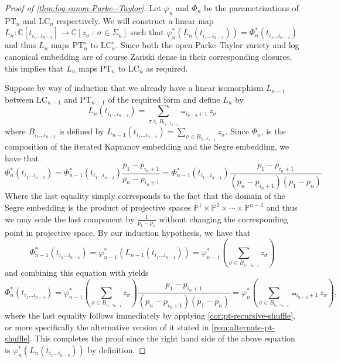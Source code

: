 \documentclass[12pt, reqno]{amsart}
\numberwithin{equation}{section}
\theoremstyle{plain}
\theoremstyle{definition}
\newcommand{\cc}{\mathbb{C}}
\newcommand{\pp}{\mathbb{P}}
\newcommand{\pt}{\mathrm{PT}}
\newcommand{\lc}{\mathrm{LC}}
\begin{document}
\begin{proof}[Proof of \cref{thm:log-canon-Parke--Taylor}]
Let $\varphi_n$ and $\Phi_n$ be the parametrizations of $\pt_n$ and $\lc_n$ respectively. We will construct a linear map $L_n: \cc[t_{i_1 \ldots i_{n-3}}] \to \cc[z_\sigma ~:~ \sigma \in \Sigma_n ]$ such that $\varphi_n^\ast(L_n(t_{i_1 \ldots i_{n-3}})) = \Phi_n^\ast(t_{i_1 \ldots i_{n-3}})$
and thus $L_n$ maps $\pt_n^\circ$ to $\lc_n^\circ$. Since both the open Parke--Taylor variety and log canonical embedding are of course Zariski dense in their corresponding closures, this implies that $L_n$ maps $\pt_n$ to $\lc_n$ as required. 

Suppose by way of induction that we already have a linear isomorphism $L_{n-1}$ between $\lc_{n-1}$ and $\pt_{n-1}$ of the required form and define $L_n$ by
\[
L_n(t_{i_1 \ldots i_{n-3}}) = \sum_{\sigma \in B_{i_1 \ldots i_{n-4}}} \shuffle_{i_{n-3} + 1} z_\sigma 
\] 
where $B_{i_1 \ldots i_{n-1}}$ is defined by $L_{n-1}(t_{i_1 \ldots i_{n-4}}) = \sum_{\sigma \in B_{i_1 \ldots i_{n-4}}} z_\sigma$. Since $\Phi_n$, is the composition of the iterated Kapranov embedding and the Segre embedding, we have that
\begin{equation}
\label{eqn:recursive-log-canon}
\Phi_n^\ast(t_{i_1 \ldots i_{n-3}})= \Phi_{n-1}^\ast(t_{i_1 \ldots i_{n-4}}) \frac{p_1 - p_{i_n + 1}}{p_n - p_{i_n + 1}} = 
\Phi_{n-1}^\ast(t_{i_1 \ldots i_{n-4}}) \frac{p_1 - p_{i_n + 1}}{(p_n - p_{i_n + 1})(p_1 - p_n)}
\end{equation}
Where the last equality simply corresponds to the fact that the domain of the Segre embedding is the product of projective spaces $\pp^1 \times \pp^2 \times \cdots \times \pp^{n-3}$ and thus we may scale the last component by $\frac{1}{p_1 - p_n}$ without changing the corresponding point in projective space. By our induction hypothesis, we have that
\begin{equation*}
\Phi_{n-1}^\ast(t_{i_1 \ldots i_{n-4}}) = \varphi_{n-1}^\ast(L_{n-1}(t_{i_1 \ldots i_{n-4}})) = \varphi_{n-1}^\ast \left(\sum_{\sigma \in B_{i_1 \ldots i_{n-4}}} z_\sigma \right)
\end{equation*}
and combining this equation with  yields
\[
\Phi_n^\ast(t_{i_1 \ldots i_{n-3}}) = \varphi_{n-1}^\ast \left(\sum_{\sigma \in B_{i_1 \ldots i_{n-4}}} z_\sigma \right) \frac{p_1 - p_{i_n + 1}}{(p_n - p_{i_n + 1})(p_1 - p_n)} = \varphi_n^\ast \left( \sum_{\sigma \in B_{i_1 \ldots i_{n-4}}} \shuffle_{i_{n-3}+ 1} z_\sigma \right),
\]
where the last equality follows immediately by applying \cref{cor:pt-recursive-shuffle}, or more specifically the alternative version of it stated in \cref{rem:alternate-pt-shuffle}. This completes the proof since the right hand side of the above equation is $\varphi_n^\ast(L_n(t_{i_1 \ldots i_{n-3}}))$ by definition.  
\end{proof}
\end{document}
